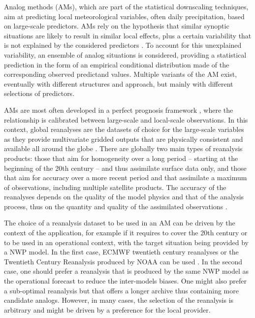 \documentclass[alpha-refs]{wiley-article}
\begin{document}
Analog methods (AMs), which are part of the statistical downscaling techniques, aim at predicting local meteorological variables, often daily precipitation, based on large-scale predictors. AMs rely on the hypothesis that similar synoptic situations are likely to result in similar local effects, plus a certain variability that is not explained by the considered predictors \citep{Lorenz1969}. To account for this unexplained variability, an ensemble of analog situations is considered, providing a statistical prediction in the form of an empirical conditional distribution made of the corresponding observed predictand values. Multiple variants of the AM exist, eventually with different structures and approach, but mainly with different selections of predictors.

AMs are most often developed in a perfect prognosis framework \citep{Rummukainen1997, Maraun2010}, where the relationship is calibrated between large-scale and local-scale observations. In this context, global reanalyses are the datasets of choice for the large-scale variables as they provide multivariate gridded outputs that are physically consistent and available all around the globe \citep{Gelaro2017}. There are globally two main types of reanalysis products: those that aim for homogeneity over a long period -- starting at the beginning of the 20th century -- and thus assimilate surface data only, and those that aim for accuracy over a more recent period and that assimilate a maximum of observations, including multiple satellite products. The accuracy of the reanalyses depends on the quality of the model physics and that of the analysis process, thus on the quantity and quality of the assimilated observations \citep{Dee2011a}.

The choice of a reanalysis dataset to be used in an AM can be driven by the context of the application, for example if it requires to cover the 20th century or to be used in an operational context, with the target situation being provided by a NWP model. In the first case, ECMWF twentieth century reanalyses \citep[ERA-20C or CERA-20C --][]{Poli2016, Laloyaux2016} or the Twentieth Century Reanalysis \citep[20CR --][]{Compo2011} produced by NOAA can be used \citep[for example,][]{Kuentz2015, Caillouet2016, Brigode2016, Bonnet2017}. In the second case, one should prefer a reanalysis that is produced by the same NWP model as the operational forecast to reduce the inter-models biases. One might also prefer a sub-optimal reanalysis but that offers a longer archive thus containing more candidate analogs. However, in many cases, the selection of the reanalysis is arbitrary and might be driven by a preference for the local provider. 
\end{document}
